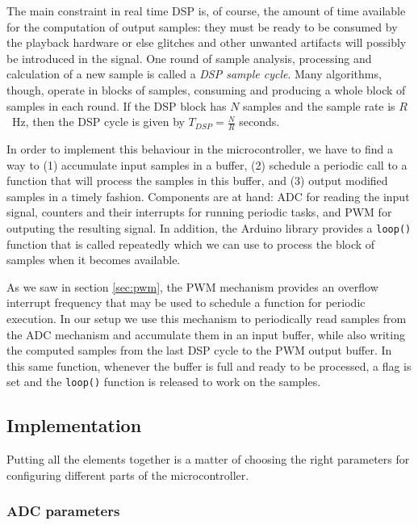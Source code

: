 The main constraint in real time DSP is, of course, the amount of time
available for the computation of output samples: they must be ready to be
consumed by the playback hardware or else glitches and other unwanted
artifacts will possibly be introduced in the signal. One round of sample
analysis, processing and calculation of a new sample is called a \emph{DSP sample
cycle}. Many algorithms, though, operate in blocks of samples, consuming and
producing a whole block of samples in each round.
If the DSP block has $N$ samples and the sample rate is
$R$~Hz, then the DSP cycle is given by $T_{DSP}=\frac{N}{R}$ seconds.

In order to implement this behaviour in the microcontroller, we have to find a
way to (1) accumulate input samples in a buffer, (2) schedule a periodic call
to a function that will process the samples in this buffer, and (3) output
modified samples in a timely fashion. Components are at hand: ADC for reading
the input signal, counters and their interrupts for running periodic tasks, and PWM for outputing
the resulting signal. In addition, the Arduino library provides a \texttt{loop()}
function that is called repeatedly which we can use to process the block of
samples when it becomes available.

As we saw in section \ref{sec:pwm}, the
PWM mechanism provides an overflow interrupt frequency that may be used to
schedule a function for periodic execution. In our setup we use this mechanism
to periodically read samples from the ADC mechanism and accumulate them in an input
buffer, while also writing the computed samples from the last DSP cycle to the PWM output buffer. In
this same function, whenever the buffer is full and ready to be processed,
a flag is set and the \texttt{loop()} function is released to work
on the samples.


\subsection{Implementation}

Putting all the elements together is a matter of choosing the right parameters
for configuring different parts of the microcontroller.

\subsubsection{ADC parameters}

